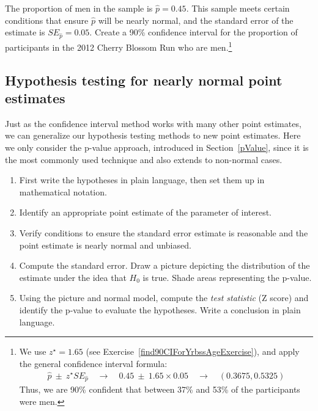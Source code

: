 \begin{exercise}
The proportion of men in the  sample is $\hat{p}=0.45$. This sample meets certain conditions that ensure $\hat{p}$ will be nearly normal, and the standard error of the estimate is $SE_{\hat{p}}=0.05$. Create a 90\% confidence interval for the proportion of participants in the 2012 Cherry Blossom Run who are men.\footnote{We use $z^{\star}=1.65$ (see Exercise~\vref{find90CIForYrbssAgeExercise}), and apply the general confidence interval formula:
\begin{eqnarray*}
\hat{p}\ \pm\ z^{\star}SE_{\hat{p}}
	\quad\to\quad 0.45\ \pm\ 1.65\times 0.05
	\quad\to\quad (0.3675, 0.5325)
\end{eqnarray*}
Thus, we are 90\% confident that between 37\% and 53\% of the participants were men.}
\end{exercise}


\subsection{Hypothesis testing for nearly normal point estimates}

Just as the confidence interval method works with many other point estimates, we can generalize our hypothesis testing methods to new point estimates. Here we only consider the p-value approach, introduced in Section~\ref{pValue}, since it is the most commonly used technique and also extends to non-normal cases.

\begin{termBox}{
\begin{enumerate}
\setlength{\itemsep}{0mm}
\item First write the hypotheses in plain language, then set them up in mathematical notation.
\item Identify an appropriate point estimate of the parameter of interest.
\item Verify conditions to ensure the standard error estimate is reasonable and the point estimate is nearly normal and unbiased.
\item Compute the standard error. Draw a picture depicting the distribution of the estimate under the idea that $H_0$ is true. Shade areas representing the p-value.
\item Using the picture and normal model, compute the \emph{test statistic} (Z score) and identify the p-value to evaluate the hypotheses. Write a conclusion in plain language.
\end{enumerate}}
\end{termBox}

